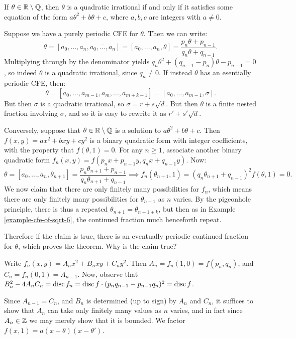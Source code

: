 \documentclass{article}
\begin{document}
\begin{prf}
    If $\theta \in \mathbb{R} \setminus \mathbb{Q}$, then $\theta$ is a quadratic irrational if and only if it satisfies some equation of the form $a \theta^2 + b \theta + c$, where $a, b, c$ are integers with $a \neq 0$.
    
    Suppose we have a purely periodic CFE for $\theta$. Then we can write:
    \[
	\theta = [a_0, \dots, a_n, \overline{a_0, \dots, a_n}] =
	[a_0, \dots, a_n, \theta] = \frac{p_n \theta + p_{n-1}}{q_n \theta + q_{n-1}}.
	\]
	Multiplying through by the denominator yields $q_n\theta^2 + (q_{n-1} - p_n) \theta - p_{n-1} = 0$, so indeed $\theta$ is a quadratic irrational, since $q_n \neq 0$. If instead $\theta$ has an esentially periodic CFE, then:
    \[
	\theta = [a_0, \dots, a_{m-1}, \overline{a_m, \dots, a_{m+k-1}}] =
	[a_0, \dots, a_{m-1}, \sigma].
	\]
	But then $\sigma$ is a quadratic irrational, so $\sigma = r + s \sqrt{d}$. But then $\theta$ is a finite nested fraction involving $\sigma$, and so it is easy to rewrite it as $r' + s'\sqrt d$.
	
	Conversely, suppose that $\theta \in \mathbb{R} \setminus \mathbb{Q}$ is a solution to $a \theta^2 + b \theta + c$. Then $f(x, y) = ax^2 + bxy + cy^2$ is a binary quadratic form with integer coefficients, with the property that $f(\theta, 1) = 0$. For any $n \geq 1$, associate another binary quadratic form $f_n(x, y) = f(p_nx + p_{n-1}y, q_n x + q_{n-1}y)$. Now:
	\[
	\theta = [a_0, \dots, a_n, \theta_{n+1}] =
	\frac{p_n \theta_{n+1} + p_{n-1}}{q_n \theta_{n+1} + q_{n-1}}
	\implies
	f_n(\theta_{n+1}, 1) = (q_n\theta_{n+1} + q_{n-1})^2 f(\theta,1) = 0.
	\]
	We now claim that there are only finitely many possibilities for $f_n$, which means there are only finitely many possibilities for $\theta_{n+1}$ as $n$ varies. By the pigeonhole principle, there is thus a repeated $\theta_{n+1} = \theta_{n+1+k}$, but then as in Example \ref{example-cfe-of-sqrt-6}, the continued fraction much henceforth repeat.
	
	Therefore if the claim is true, there is an eventually periodic continued fraction for $\theta$, which proves the theorem. Why is the claim true?
	
	Write $f_n(x, y) = A_nx^2 + B_nxy + C_ny^2$. Then $A_n = f_n(1, 0) = f(p_n, q_n)$, and $C_n = f_n(0, 1) = A_{n-1}$. Now, observe that $B_n^2 - 4A_nC_n = \operatorname{disc} f_n = \operatorname{disc} f \cdot (p_n q_{n-1} - p_{n-1}q_n)^2 = \operatorname{disc} f$.
	
	Since $A_{n-1} = C_n$, and $B_n$ is determined (up to sign) by $A_n$ and $C_n$, it suffices to show that $A_n$ can take only finitely many values as $n$ varies, and in fact since $A_n \in \mathbb{Z}$ we may merely show that it is bounded. We factor $f(x, 1) = a(x-\theta)(x-\theta')$.
	

\end{prf}
\end{document}
